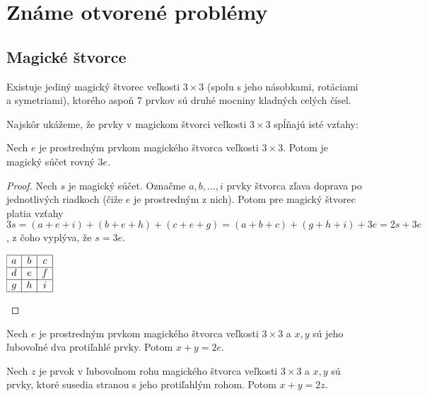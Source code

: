 \chapter{Známe otvorené problémy}

\label{kap:openproblems} %

\section{Magické štvorce}

\begin{hypothesis} Existuje jediný magický štvorec veľkosti $3 \times 3$ (spolu s jeho násobkami, rotáciami a symetriami), ktorého aspoň $7$ prvkov sú druhé mocniny kladných celých čísel.
\end{hypothesis}

Najskôr ukážeme, že prvky v magickom štvorci veľkosti $3 \times 3$ spĺňajú isté vzťahy:

\begin{theorem} Nech $e$ je prostredným prvkom magického štvorca veľkosti $3 \times 3$. Potom je magický súčet rovný $3e$.
\end{theorem}

\begin{proof} Nech $s$ je magický súčet. Označme $a, b, \dots , i$ prvky štvorca zľava doprava po jednotlivých riadkoch (čiže $e$ je prostredným z nich).  Potom pre magický štvorec platia vzťahy $3s = (a + e + i) + (b + e + h) + (c + e + g) = (a + b + c) + (g + h + i) + 3e = 2s + 3e$, z čoho vyplýva, že $s = 3e$.

\begin{center}
$\begin{array}{ |c|c|c| } 
\hline
a & b & c \\ 
\hline
d & e & f \\ 
\hline
g & h & i \\
\hline
\end{array}$
\end{center}
\end{proof}

\begin{consequence}
\label{square3x3xy}
Nech $e$ je prostredným prvkom magického štvorca veľkosti $3 \times 3$ a $x,y$ sú jeho ľubovoľné dva protiľahlé prvky. Potom $x + y = 2e$.
\end{consequence}

\begin{consequence}
\label{square3x3afh}
Nech $z$ je prvok v ľubovoľnom rohu magického štvorca veľkosti $3 \times 3$ a $x,y$ sú prvky, ktoré susedia stranou s jeho protiľahlým rohom. Potom $x + y = 2z$.
\end{consequence}


